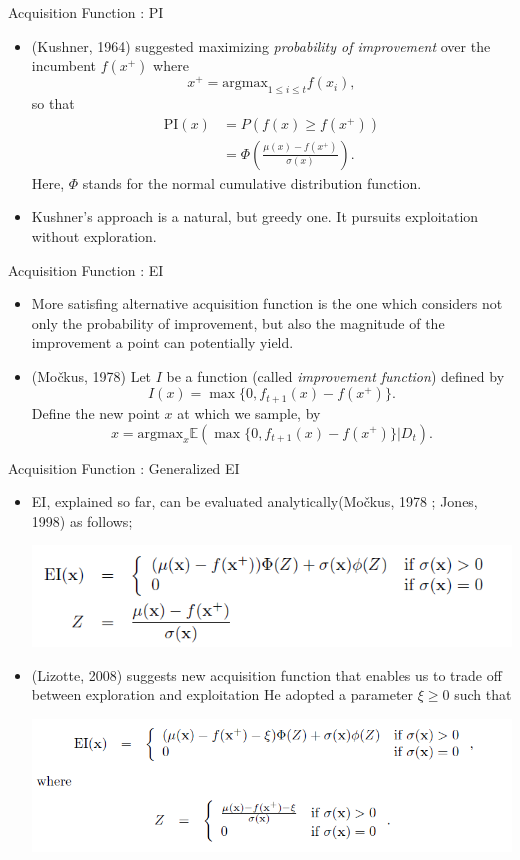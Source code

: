 \documentclass{beamer}
\begin{document}
%
\begin{frame}{Acquisition Function : PI}
\begin{itemize}
\item
(Kushner, 1964) suggested maximizing \emph{probability of improvement} over the incumbent \(f(x^+)\) where
\[x^+=\text{argmax}_{1\le i\le t}f(x_i),\]
so that
\begin{align*}
\text{PI}(x)
&=P(f(x)\ge f(x^+))\\
&=\Phi\left(\frac{\mu(x)-f(x^+)}{\sigma(x)}\right).
\end{align*}
Here, \(\Phi\) stands for the normal cumulative distribution function.
\item
Kushner's approach is a natural, but greedy one.
It pursuits exploitation without exploration.
\end{itemize}
\end{frame}

%
\begin{frame}{Acquisition Function : EI}
\begin{itemize}
\item
More satisfing alternative acquisition function is the one which considers not only the probability of improvement, but also the magnitude of the improvement a point can potentially yield.
\item
(Močkus, 1978) Let \(I\) be a function (called \emph{improvement function}) defined by
\[I(x)=\max\{0,f_{t+1}(x)-f(x^+)\}.\]
Define the new point \(x\) at which we sample, by
\[x=\text{argmax}_x\mathbb E\left(\max\{0,f_{t+1}(x)-f(x^+)\}|D_t\right).\]
\end{itemize}
\end{frame}

%
\begin{frame}{Acquisition Function : Generalized EI}
\begin{itemize}
\item
EI, explained so far, can be evaluated analytically(Močkus, 1978 ; Jones, 1998) as follows;
\begin{center}
\includegraphics[width=.7\textwidth]{analytic_form_1}
\end{center}
\item
(Lizotte, 2008) suggests new acquisition function that enables us to trade off between exploration and exploitation
He adopted a parameter \(\xi\ge0\) such that
\begin{center}
\includegraphics[width=.7\textwidth]{analytic_form_2}
\end{center}
\end{itemize}
\end{frame}



%
\end{document}
